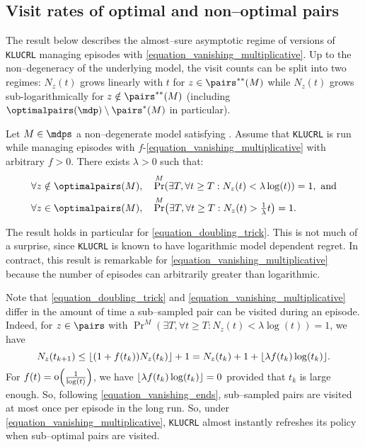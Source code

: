 \documentclass[preprint,cleveref,12pt]{colt2025}
\DeclarePairedDelimiter{\parens}{(}{)}	%
\DeclarePairedDelimiter{\floor}{\lfloor}{\rfloor}	%
\DeclareMathOperator*{\oh}{\mathrm{o}}
\def\model{\mdp}
\def\models{\mdps}
\def\optpairs{\optimalpairs}
\begin{document}
    \subsection{Visit rates of optimal and non--optimal pairs}
    \label{section_macroscopic_coherence}

    The result below describes the almost--sure asymptotic regime of versions of \texttt{KLUCRL} managing episodes with \eqref{equation_vanishing_multiplicative}. 
    Up to the non--degeneracy of the underlying model, the visit counts can be split into two regimes: $N_z(t)$ grows linearly with $t$ for $z \in \pairs^{**}(M)$ while $N_z(t)$ grows sub-logarithmically for $z \notin \pairs^{**}(M)$ (including $\optpairs(\model) \setminus \pairs^*(M)$ in particular).

    \begin{lemma}
    \label{lemma_asymptotic_regime}
        Let $M \in \models$ a non--degenerate model satisfying .
        Assume that \texttt{KLUCRL} is run while managing episodes with $f$-\eqref{equation_vanishing_multiplicative} with arbitrary $f > 0$.
        There exists $\lambda > 0$ such that:
        \begin{align*}
            \forall z \notin \optpairs(M), \quad
            & \Pr^M \parens*{
                \exists T, \forall t \ge T :
                N_z(t) < \lambda \log(t)
            } = 1, 
            \text{~and}
            \\
            \forall z \in \optpairs(M), \quad
            & \Pr^M \parens*{
                \exists T, \forall t \ge T :
                N_z(t) > \tfrac 1\lambda t
            } = 1.
        \end{align*}
    \end{lemma}

    The result holds in particular for \eqref{equation_doubling_trick}.
    This is not much of a surprise, since \texttt{KLUCRL} is known to have logarithmic model dependent regret.
    In contract, this result is remarkable for \eqref{equation_vanishing_multiplicative} because the number of episodes can arbitrarily greater than logarithmic. 

    Note that \eqref{equation_doubling_trick} and \eqref{equation_vanishing_multiplicative} differ in the amount of time a sub--sampled pair can be visited during an episode. 
    Indeed, for $z \in \pairs$ with $\Pr^M(\exists T, \forall t \ge T : N_z(t) < \lambda \log(t)) = 1$, we have
    \begin{equation}
    \label{equation_vanishing_ends}
        N_z(t_{k+1}) 
        \le \floor{\parens*{1 + f(t_k)} N_z(t_k)} + 1
        = N_z(t_k) + 1 + \floor{\lambda f(t_k) \log(t_k)}.
    \end{equation}
    For $f(t) = \oh\parens*{\frac 1{\log(t)}}$, we have $\floor{\lambda f(t_k) \log(t_k)} = 0$ provided that $t_k$ is large enough.
    So, following \eqref{equation_vanishing_ends}, sub--sampled pairs are visited at most once per episode in the long run.
    So, under \eqref{equation_vanishing_multiplicative}, \texttt{KLUCRL} almost instantly refreshes its policy when sub--optimal pairs are visited. 
\end{document}
